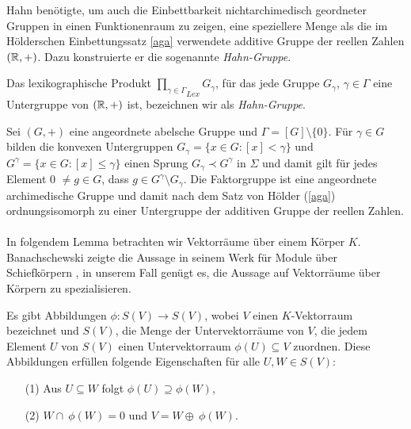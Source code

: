 Hahn benötigte, um auch die Einbettbarkeit nichtarchimedisch geordneter Gruppen in einen Funktionenraum zu zeigen, eine speziellere Menge als die im Hölderschen Einbettungssatz \ref{aga} verwendete additive Gruppe der reellen Zahlen $\left(\mathbb{R}, +\right)$. Dazu konstruierte er die sogenannte \textit{Hahn-Gruppe}.
\begin{defn}\label{Hahn-Gruppe}  %
Das lexikographische Produkt  ${\prod_{\gamma \in \Gamma}}_{Lex} G_\gamma$, für das jede Gruppe $G_\gamma$, $\gamma \in\Gamma$ eine Untergruppe von $\left(\mathbb{R}, +\right)$ ist, bezeichnen wir als \textit{Hahn-Gruppe}.
\end{defn} 
Sei $\left(G, +\right)$ eine angeordnete abelsche Gruppe und $\Gamma = [G]\setminus \lbrace 0\rbrace$. Für $\gamma \in G$ bilden die konvexen Untergruppen 
$G_\gamma = \lbrace x \in G: [x] < \gamma\rbrace $ und $G^\gamma= \lbrace x \in G: [x] \le \gamma \rbrace $ einen Sprung $ G_\gamma \prec G^\gamma$ in $\Sigma$ und damit gilt für jedes Element 0 $\neq g \in G$, dass $g \in G^\gamma \setminus G_\gamma $. Die Faktorgruppe ist eine angeordnete archimedische Gruppe und damit nach dem Satz von Hölder (\ref{aga}) ordnungsisomorph zu einer Untergruppe der additiven Gruppe der reellen Zahlen.\cite{hahn07}\\\\
In folgendem Lemma betrachten wir Vektorräume über einem Körper $K$. Banachschewski zeigte die Aussage in seinem Werk für Module über Schiefkörpern \cite[Lemma 4, S. 431 - 433]{banachschewski56}, in unserem Fall genügt es, die Aussage auf Vektorräume über Körpern zu spezialisieren. 
\begin{lemma}\label{einbettungssatzLemma}
Es gibt Abbildungen $\phi: S(V) \rightarrow S(V)$, wobei $V$ einen $K$-Vektorraum bezeichnet und $S(V)$, die Menge der Untervektorräume von $V$, die jedem Element $U$ von $S(V)$ einen Untervektorraum $\phi(U)\subseteq V$ zuordnen. Diese Abbildungen erfüllen folgende Eigenschaften für alle $U, W \in S(V)$: \\
\begin{enumerate}
\item[(1)] Aus $U \subseteq W $ folgt $\phi(U) \supseteq \phi(W)$,
\item[(2)] $W \cap ~\phi(W) = 0$ und $V = W \oplus ~ \phi(W)$.
\end{enumerate} 
\end{lemma}
